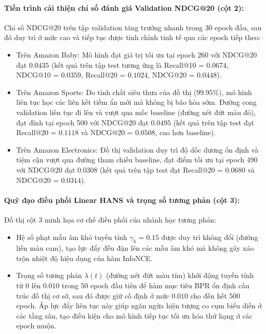 \paragraph{Tiến trình cải thiện chỉ số đánh giá Validation NDCG@20 (cột 2):}
Chỉ số NDCG@20 trên tập validation tăng trưởng nhanh trong 30 epoch đầu, sau đó duy trì ở mức cao và tiếp tục được tinh chỉnh tinh tế qua các epoch tiếp theo:
\begin{itemize}[leftmargin=*]
    \item Trên Amazon Baby: Mô hình đạt giá trị tối ưu tại epoch 260 với NDCG@20 đạt $0.0435$ (kết quả trên tập test tương ứng là Recall@10 = $0.0674$, NDCG@10 = $0.0359$, Recall@20 = $0.1024$, NDCG@20 = $0.0448$).
    \item Trên Amazon Sports: Do tính chất siêu thưa của đồ thị ($99.95\%$), mô hình liên tục học các liên kết tiềm ẩn mới mà không bị bão hòa sớm. Đường cong validation liên tục đi lên và vượt qua mốc baseline (đường nét đứt màu đỏ), đạt đỉnh tại epoch 500 với NDCG@20 đạt $0.0495$ (kết quả trên tập test đạt Recall@20 = $0.1118$ và NDCG@20 = $0.0508$, cao hơn baseline).
    \item Trên Amazon Electronics: Đồ thị validation duy trì độ dốc dương ổn định và tiệm cận vượt qua đường tham chiếu baseline, đạt điểm tối ưu tại epoch 490 với NDCG@20 đạt $0.0308$ (kết quả trên tập test đạt Recall@20 = $0.0680$ và NDCG@20 = $0.0314$).
\end{itemize}

\paragraph{Quỹ đạo điều phối Linear HANS và trọng số tương phản (cột 3):}
Đồ thị cột 3 minh họa cơ chế điều phối của nhánh học tương phản:
\begin{itemize}[leftmargin=*]
    \item Hệ số phạt mẫu âm khó tuyến tính $\gamma_h = 0.15$ được duy trì không đổi (đường liền màu cam), tạo lực đẩy đều đặn lên các mẫu âm khó mà không gây xáo trộn nhiệt độ hiệu dụng của hàm InfoNCE.
    \item Trọng số tương phản $\lambda(t)$ (đường nét đứt màu tím) khởi động tuyến tính từ 0 lên $0.010$ trong 50 epoch đầu tiên để hàm mục tiêu BPR ổn định cấu trúc đồ thị cơ sở, sau đó được giữ cố định ở mức $0.010$ cho đến hết 500 epoch. Áp lực đẩy liên tục này giúp ngăn ngừa hiện tượng co cụm biểu diễn ở các tầng sâu, tạo điều kiện cho mô hình tiếp tục tối ưu hóa thứ hạng ở các epoch muộn.
\end{itemize}

